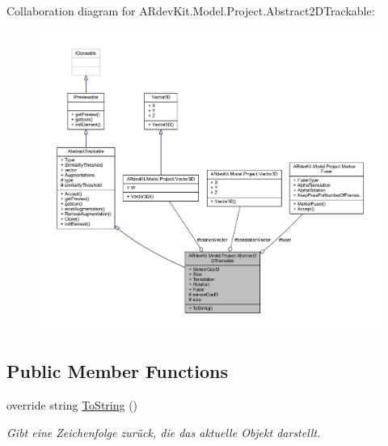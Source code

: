 Collaboration diagram for A\-Rdev\-Kit.\-Model.\-Project.\-Abstract2\-D\-Trackable\-:
\nopagebreak
\begin{figure}[H]
\begin{center}
\leavevmode
\includegraphics[width=350pt]{class_a_rdev_kit_1_1_model_1_1_project_1_1_abstract2_d_trackable__coll__graph}
\end{center}
\end{figure}
\subsection*{Public Member Functions}
\begin{DoxyCompactItemize}
\item 
override string \hyperlink{class_a_rdev_kit_1_1_model_1_1_project_1_1_abstract2_d_trackable_ac836d823c247762a615f432375d943c2}{To\-String} ()
\begin{DoxyCompactList}\small\item\em Gibt eine Zeichenfolge zurück, die das aktuelle Objekt darstellt. \end{DoxyCompactList}\end{DoxyCompactItemize}
